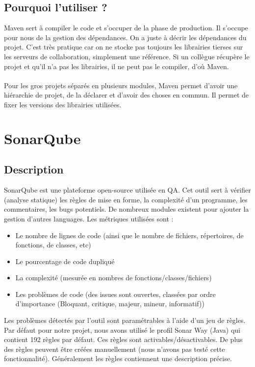 \documentclass{article}
\begin{document}
\subsection{Pourquoi l'utiliser ?}
Maven sert à compiler le code et s'occuper de la phase de production. Il s'occupe pour nous de la gestion des dépendances. On a juste à décrir les dépendances du projet. C'est très pratique car on ne stocke pas toujours les librairies tierses sur les serveurs de collaboration, simplement une référence. Si un collègue récupère le projet et qu'il n'a pas les librairies, il ne peut pas le compiler, d'où Maven. \\\\
Pour les gros projets séparés en plusieurs modules, Maven permet d'avoir une hiérarchie de projet, de la déclarer et d'avoir des choses en commun. Il permet de fixer les versions des librairies utilisées.

\section{SonarQube}
\subsection{Description}
SonarQube est une plateforme open-source utilisée en QA. Cet outil sert à vérifier (analyse statique) les règles de mise en forme, la complexité d'un programme, les commentaires, les bugs potentiels. De nombreux modules existent pour ajouter la gestion d'autres languages. Les métriques utilisées sont :
\begin{itemize}
	\item Le nombre de lignes de code (ainsi que le nombre de fichiers, répertoires, de fonctions, de classes, etc)
	\item Le pourcentage de code dupliqué
	\item La complexité (mesurée en nombres de fonctions/classes/fichiers)
	\item Les problèmes de code (des issues sont ouvertes, classées par ordre d'importance (Bloquant, critique, majeur, mineur, informatif))
\end{itemize}
Les problèmes détectés par l'outil sont paramétrables à l'aide d'un jeu de règles. Par défaut pour notre projet, nous avons utilisé le profil Sonar Way (Java) qui contient 192 règles par défaut. Ces règles sont activables/désactivables. De plus des règles peuvent être créées manuellement (nous n'avons pas testé cette fonctionnalité). Généralement les règles contiennent une description précise.
\end{document}
